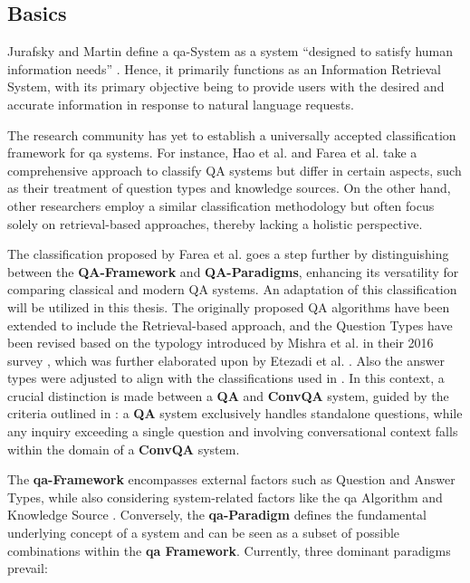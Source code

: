 \subsection{Basics}
\label{subsec:qa_basics}

Jurafsky and Martin define a \gls{qa}-System as a system \enquote{designed to satisfy human information needs} \cite{jurafsky_speech_2023}. Hence, it primarily functions as an Information Retrieval System, with its primary objective being to provide users with the desired and accurate information in response to natural language requests.

The research community has yet to establish a universally accepted classification framework for \gls{qa} systems. For instance, Hao et al. and Farea et al. \cite{hao_recent_2022, farea_evaluation_2022} take a comprehensive approach to classify QA systems but differ in certain aspects, such as their treatment of question types and knowledge sources. On the other hand, other researchers \cite{zhu_retrieving_2021, jurafsky_speech_2023, etezadi_state_2023, zhang_survey_2023} employ a similar classification methodology but often focus solely on retrieval-based approaches, thereby lacking a holistic perspective.

The classification proposed by Farea et al. \cite{farea_evaluation_2022} goes a step further by distinguishing between the \textbf{QA-Framework} and \textbf{QA-Paradigms}, enhancing its versatility for comparing classical and modern QA systems. An adaptation of this classification will be utilized in this thesis. The originally proposed QA algorithms have been extended to include the Retrieval-based approach, and the Question Types have been revised based on the typology introduced by Mishra et al. in their 2016 survey \cite{mishra_survey_2016}, which was further elaborated upon by Etezadi et al. \cite{etezadi_state_2023}. Also the answer types were adjusted to align with the classifications used in \cite{mcdonald_detect_2022,dasigi_dataset_2021}. In this context, a crucial distinction is made between a \textbf{QA} and \textbf{ConvQA} system, guided by the criteria outlined in \cite{zamani_conversational_2023}: a \textbf{QA} system exclusively handles standalone questions, while any inquiry exceeding a single question and involving conversational context falls within the domain of a \textbf{ConvQA} system.

The \textbf{\gls{qa}-Framework} encompasses external factors such as Question and Answer Types, while also considering system-related factors like the \gls{qa} Algorithm and Knowledge Source \cite{farea_evaluation_2022, hao_recent_2022}. Conversely, the \textbf{\gls{qa}-Paradigm} defines the fundamental underlying concept of a system and can be seen as a subset of possible combinations within the \textbf{\gls{qa} Framework}. Currently, three dominant paradigms prevail:

